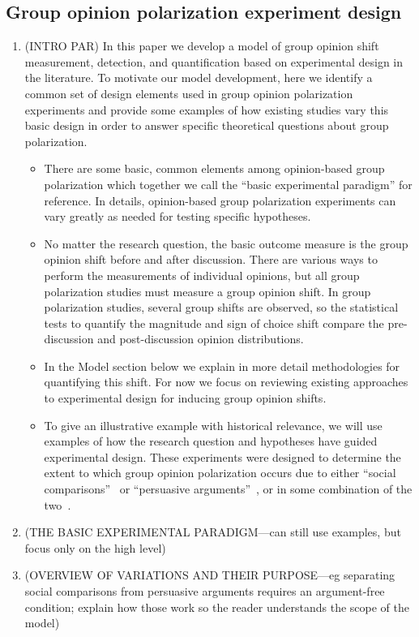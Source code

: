 \documentclass[11pt,letterpaper]{article}
\begin{document}
\subsection{Group opinion polarization experiment design}

\begin{enumerate}
  \item
    (INTRO PAR) In this paper we develop a model of group opinion shift measurement,
    detection, and quantification based on experimental design in the literature.
    To motivate our model development, here we identify a common set of
    design elements used in group opinion polarization experiments and 
    provide some examples of how existing studies vary this basic design in
    order to answer specific theoretical questions about group polarization.
    \begin{itemize}
      \item 
        There are some basic, common elements among opinion-based group polarization
        which together we call the ``basic experimental paradigm'' for reference.
        In details, opinion-based group polarization experiments can vary greatly
        as needed for testing specific hypotheses.
      \item 
        No matter the research question, the basic outcome measure is the 
        group opinion shift before and after discussion. There are various ways
        to perform the measurements of individual opinions, but all 
        group polarization studies must measure a group opinion shift. 
        In group polarization studies, several group shifts are observed, so 
        the statistical tests to quantify the magnitude and sign of choice shift
        compare the pre-discussion and post-discussion opinion distributions.
      \item
        In the Model section below we explain in more detail methodologies
        for quantifying this shift. For now we focus on reviewing existing
        approaches to experimental design for inducing group opinion shifts.
      \item
        To give an illustrative example with historical relevance, we will use
        examples of how the research question and hypotheses have guided
        experimental design. These experiments were designed
        to determine the extent to which
        group opinion polarization occurs due to either 
        ``social comparisons''~\cite{Myers1978} or ``persuasive 
        arguments''~\cite{Vinokur1978}, 
        or in some combination of the 
        two~\cite{Burnstein1973,Burnstein1977,Sieber2019}.
    \end{itemize}
  \item 
    (THE BASIC EXPERIMENTAL PARADIGM---can still use examples, but focus
    only on the high level)
  \item 
    (OVERVIEW OF VARIATIONS AND THEIR PURPOSE---eg separating social comparisons
    from persuasive arguments requires an argument-free condition; explain 
    how those work so the reader understands the scope of the model)
\end{enumerate}
\end{document}

